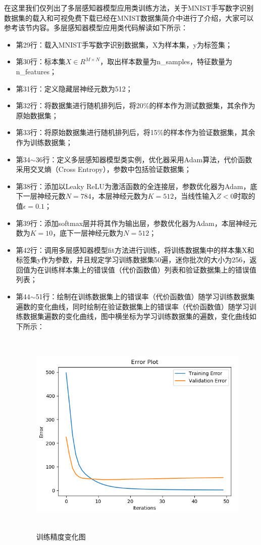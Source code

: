 \documentclass[UTF8]{article}
\begin{document}
在这里我们仅列出了多层感知器模型应用类训练方法，关于MNIST手写数字识别数据集的载入和可视免费下载已经在MNIST数据集简介中进行了介绍，大家可以参考该节内容。多层感知器模型应用类代码解读如下所示：
\begin{itemize}
\item 第29行：载入MNIST手写数字识别数据集，X为样本集，y为标签集；
\item 第30行：标本集$X \in R^{M \times N}$，取出样本数量为n\_samples，特征数量为n\_features；
\item 第31行：定义隐藏层神经元数为512；
\item 第32行：将数据集进行随机排列后，将20\%的样本作为测试数据集，其余作为原始数据集；
\item 第33行：将原始数据集进行随机排列后，将15\%的样本作为验证数据集，其余作为训练数据集；
\item 第34$\sim$36行：定义多层感知器模型类实例，优化器采用Adam算法，代价函数采用交叉熵（Cross Entropy），参数中包括验证数据集；
\item 第38行：添加以Leaky ReLU为激活函数的全连接层，参数优化器为Adam，底下一层神经元数$N=784$，本层神经元数为$K=512$，当线性输入$Z<0$时取的值$\epsilon=0.1$；
\item 第39行：添加softmax层并将其作为输出层，参数优化器为Adam，本层神经元数为$K=10$，底下一层神经元数为$N=512$；
\item 第42行：调用多层感知器模型fit方法进行训练，将训练数据集中的样本集X和标签集y作为参数，并且规定学习训练数据集50遍，迷你批次的大小为256，返回值为在训练样本集上的错误值（代价函数值）列表和验证数据集上的错误值列表；
\item 第44$\sim$51行：绘制在训练数据集上的错误率（代价函数值）随学习训练数据集遍数的变化曲线，同时绘制在验证数据集上的错误率（代价函数值）随学习训练数据集遍数的变化曲线，图中横坐标为学习训练数据集的遍数，变化曲线如下所示：
\begin{figure}[H]
	\caption{训练精度变化图}
	\label{f000072}
	\centering
	\includegraphics[height=10cm]{images/f000072}

\end{figure}
\end{itemize}
\end{document}
